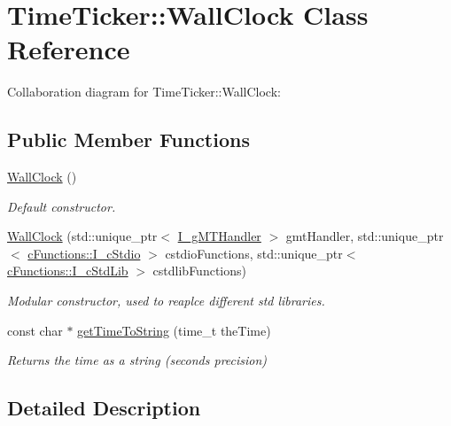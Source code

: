 \hypertarget{classTimeTicker_1_1WallClock}{}\section{Time\+Ticker\+::Wall\+Clock Class Reference}
\label{classTimeTicker_1_1WallClock}


Collaboration diagram for Time\+Ticker\+::Wall\+Clock\+:
\subsection*{Public Member Functions}
\begin{DoxyCompactItemize}
\item 
\mbox{\label{classTimeTicker_1_1WallClock_aceaa001d0b506441be4e15622eedb030}} 
\mbox{\hyperlink{classTimeTicker_1_1WallClock_aceaa001d0b506441be4e15622eedb030}{Wall\+Clock}} ()
\begin{DoxyCompactList}\small\item\em Default constructor. \end{DoxyCompactList}\item 
\mbox{\hyperlink{classTimeTicker_1_1WallClock_a9ddde6ee806f00e9942a2dacb147e5ad}{Wall\+Clock}} (std\+::unique\+\_\+ptr$<$ \mbox{\hyperlink{classTimeTicker_1_1I__gMTHandler}{I\+\_\+g\+M\+T\+Handler}} $>$ gmt\+Handler, std\+::unique\+\_\+ptr$<$ \mbox{\hyperlink{classcFunctions_1_1I__cStdio}{c\+Functions\+::\+I\+\_\+c\+Stdio}} $>$ cstdio\+Functions, std\+::unique\+\_\+ptr$<$ \mbox{\hyperlink{classcFunctions_1_1I__cStdLib}{c\+Functions\+::\+I\+\_\+c\+Std\+Lib}} $>$ cstdlib\+Functions)
\begin{DoxyCompactList}\small\item\em Modular constructor, used to reaplce different std libraries. \end{DoxyCompactList}\item 
const char $\ast$ \mbox{\hyperlink{classTimeTicker_1_1WallClock_aafa31e3c3a49b0918a71dda59638b000}{get\+Time\+To\+String}} (time\+\_\+t the\+Time)
\begin{DoxyCompactList}\small\item\em Returns the time as a string (seconds precision) \end{DoxyCompactList}\end{DoxyCompactItemize}


\subsection{Detailed Description}


